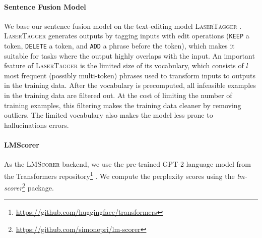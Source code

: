 \paragraph{Sentence Fusion Model} We base our sentence fusion model on the text-editing model \textsc{LaserTagger} \cite{malmi2019lasertagger}. \textsc{LaserTagger} generates outputs by tagging inputs with edit operations (\texttt{KEEP} a token, \texttt{DELETE} a token, and \texttt{ADD} a phrase before the token), which makes it suitable for tasks where the output highly overlaps with the input. An important feature of \textsc{LaserTagger} is the limited size of its vocabulary, which consists of $l$ most frequent (possibly multi-token) phrases used to transform inputs to outputs in the training data. After the vocabulary is precomputed, all infeasible examples in the training data are filtered out. At the cost of limiting the number of training examples, this filtering makes the training data cleaner by removing outliers. The limited vocabulary also makes the model less prone to hallucinations errors.

\paragraph{LMScorer} As the \textsc{LMScorer} backend, we use the pre-trained GPT-2 language model \citep{radford2019language} from the Transformers repository\footnote{\url{https://github.com/huggingface/transformers}} \citep{wolf2019HuggingFacesTS}. We compute the perplexity scores using the \textit{lm-scorer}\footnote{\url{https://github.com/simonepri/lm-scorer}} package.






